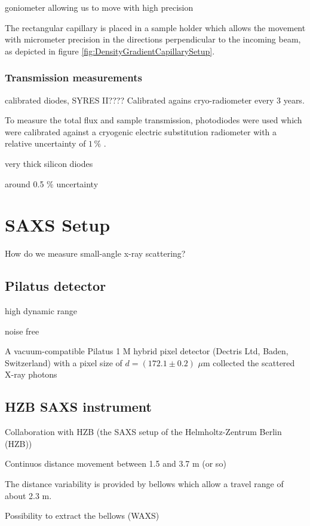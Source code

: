 goniometer allowing us to move with high precision

The rectangular capillary is placed in a sample holder which allows the movement with micrometer precision in the directions perpendicular to the incoming beam, as depicted in figure \ref{fig:DensityGradientCapillarySetup}.

\subsubsection{Transmission measurements}

calibrated diodes, SYRES II???? Calibrated agains cryo-radiometer every 3 years.

To measure the total flux and sample transmission, photodiodes were used which were calibrated against a cryogenic electric substitution radiometer with a relative uncertainty of \( 1\,\% \) \cite{krumrey_high-accuracy_2001}.

very thick silicon diodes

around 0.5 $\%$ uncertainty

\section{SAXS Setup}

How do we measure small-angle x-ray scattering?

\subsection{Pilatus detector}
high dynamic range

noise free

A vacuum-compatible Pilatus 1 M hybrid pixel detector (Dectris Ltd, Baden, Switzerland) with a pixel size of $d = (172.1 \pm 0.2)$ $\mu$m collected the scattered X-ray photons

\subsection{HZB SAXS instrument}

Collaboration with HZB (the SAXS setup of the Helmholtz-Zentrum Berlin (HZB))

Continuos distance movement between 1.5 and 3.7 m (or so)

The distance variability is provided by bellows which allow a travel range of about 2.3 m. 

Possibility to extract the bellows (WAXS)

